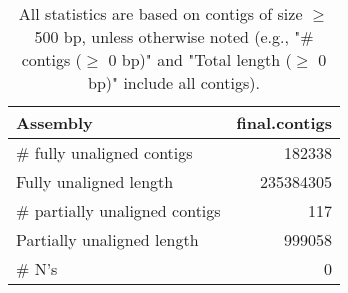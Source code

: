 \documentclass[12pt,a4paper]{article}
\begin{document}
\begin{table}[ht]
\begin{center}
\caption{All statistics are based on contigs of size $\geq$ 500 bp, unless otherwise noted (e.g., "\# contigs ($\geq$ 0 bp)" and "Total length ($\geq$ 0 bp)" include all contigs).}
\begin{tabular}{|l*{1}{|r}|}
\hline
Assembly & final.contigs \\ \hline
\# fully unaligned contigs & 182338 \\ \hline
Fully unaligned length & 235384305 \\ \hline
\# partially unaligned contigs & 117 \\ \hline
Partially unaligned length & 999058 \\ \hline
\# N's & 0 \\ \hline
\end{tabular}
\end{center}
\end{table}
\end{document}
